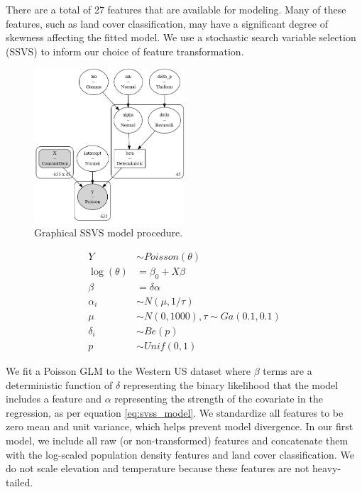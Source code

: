 \documentclass[notitlepage]{article}
\begin{document}
There are a total of 27 features that are available for modeling.
Many of these features, such as land cover classification, may have a significant degree of skewness affecting the fitted model.
We use a stochastic search variable selection (SSVS) to inform our choice of feature transformation.

\begin{figure}[H]
\centering
\includegraphics[width=0.5\textwidth]{report/figures/svss_model.png}
\caption{Graphical SSVS model procedure.}
\end{figure}

\begin{equation}
\label{eq:svss_model}
\begin{aligned}
    Y &\sim Poisson(\theta) \\
    \log(\theta) &= \beta_0 + X \beta \\
    \beta &= \delta \alpha \\
    \alpha_i &\sim N(\mu, 1/\tau) \\
    \mu &\sim N(0, 1000), \tau \sim Ga(0.1, 0.1) \\
    \delta_i &\sim Be(p) \\
    p &\sim Unif(0, 1)
\end{aligned}
\end{equation}

We fit a Poisson GLM to the Western US dataset where $\beta$ terms are a deterministic function of $\delta$ representing the binary likelihood that the model includes a feature and $\alpha$ representing the strength of the covariate in the regression, as per equation \ref{eq:svss_model}.
We standardize all features to be zero mean and unit variance, which helps prevent model divergence.
In our first model, we include all raw (or non-transformed) features and concatenate them with the log-scaled population density features and land cover classification.
We do not scale elevation and temperature because these features are not heavy-tailed.
\end{document}
